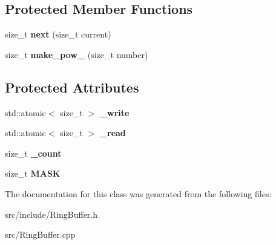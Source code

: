 \subsection*{Protected Member Functions}
\begin{DoxyCompactItemize}
\item 
\hypertarget{class_ring_buffer_a4c8bf5ff8699e136113bf796a93f176e}{size\+\_\+t {\bfseries next} (size\+\_\+t current)}\label{class_ring_buffer_a4c8bf5ff8699e136113bf796a93f176e}

\item 
\hypertarget{class_ring_buffer_a5ee1159455f22c896e3c68490195653a}{size\+\_\+t {\bfseries make\+\_\+pow\+\_} (size\+\_\+t number)}\label{class_ring_buffer_a5ee1159455f22c896e3c68490195653a}

\end{DoxyCompactItemize}
\subsection*{Protected Attributes}
\begin{DoxyCompactItemize}
\item 
\hypertarget{class_ring_buffer_a5596c66d11415b18079900dade27ca16}{std\+::atomic$<$ size\+\_\+t $>$ {\bfseries \+\_\+write}}\label{class_ring_buffer_a5596c66d11415b18079900dade27ca16}

\item 
\hypertarget{class_ring_buffer_a967bf4fffb3b2972f73f285700c65da3}{std\+::atomic$<$ size\+\_\+t $>$ {\bfseries \+\_\+read}}\label{class_ring_buffer_a967bf4fffb3b2972f73f285700c65da3}

\item 
\hypertarget{class_ring_buffer_a838f9941e8f86efcc828601c8643dae5}{size\+\_\+t {\bfseries \+\_\+count}}\label{class_ring_buffer_a838f9941e8f86efcc828601c8643dae5}

\item 
\hypertarget{class_ring_buffer_a757ddc38be1a1aa05fb0f466e2c57d92}{size\+\_\+t {\bfseries M\+A\+S\+K}}\label{class_ring_buffer_a757ddc38be1a1aa05fb0f466e2c57d92}

\end{DoxyCompactItemize}


The documentation for this class was generated from the following files\+:\begin{DoxyCompactItemize}
\item 
src/include/Ring\+Buffer.\+h\item 
src/Ring\+Buffer.\+cpp\end{DoxyCompactItemize}
